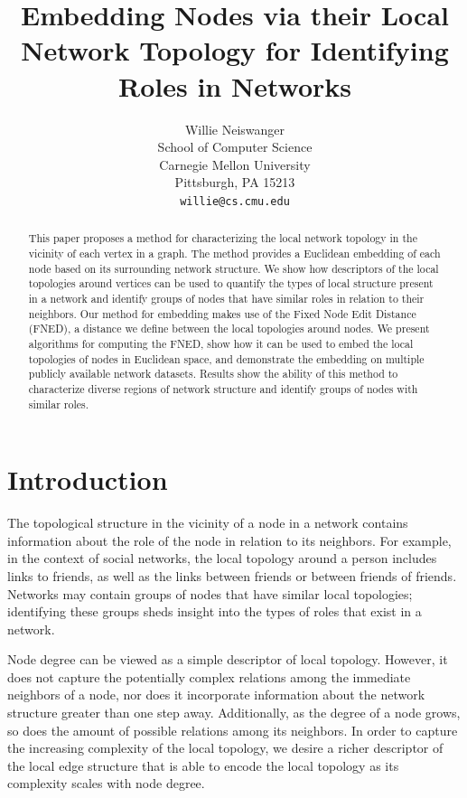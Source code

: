 \documentclass{article}
\title{Embedding Nodes via their Local Network Topology for Identifying Roles in Networks}
\author{
Willie Neiswanger\\
School of Computer Science\\
Carnegie Mellon University\\
Pittsburgh, PA 15213 \\
\texttt{willie@cs.cmu.edu} \\
}
\begin{document}
\maketitle

\begin{abstract}
This paper proposes a method for characterizing the local network topology in the vicinity of each vertex in a graph. The method provides a Euclidean embedding of each node based on its surrounding network structure. We show how descriptors of the local topologies around vertices can be used to quantify the types of local structure present in a network and identify groups of nodes that have similar roles in relation to their neighbors. Our method for embedding makes use of the Fixed Node Edit Distance (FNED), a distance we define between the local topologies around nodes. We present algorithms for computing the FNED, show how it can be used to embed the local topologies of nodes in Euclidean space, and demonstrate the embedding on multiple publicly available network datasets. Results show the ability of this method to characterize diverse regions of network structure and identify groups of nodes with similar roles.
\end{abstract}


\section{Introduction}
\label{sec:intro}

The topological structure in the vicinity of a node in a network contains information about the role of the node in relation to its neighbors. For example, in the context of social networks, the local topology around a person includes links to friends, as well as the links between friends or between friends of friends. Networks may contain groups of nodes that have similar local topologies; identifying these groups sheds insight into the types of roles that exist in a network. %

Node degree can be viewed as a simple descriptor of local topology. However, it does not capture the potentially complex relations among the immediate neighbors of a node, nor does it incorporate information about the network structure greater than one step away. Additionally, as the degree of a node grows, so does the amount of possible relations among its neighbors. In order to capture the increasing complexity of the local topology, we desire a richer descriptor of the local edge structure that is able to encode the local topology as its complexity scales with node degree.
\end{document}
